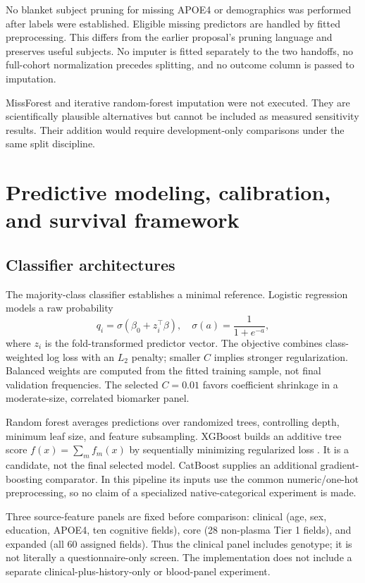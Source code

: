 \documentclass[11pt,a4paper]{article}
\begin{document}
No blanket subject pruning for missing APOE4 or demographics was performed after labels were established. Eligible missing predictors are handled by fitted preprocessing. This differs from the earlier proposal's pruning language and preserves useful subjects. No imputer is fitted separately to the two handoffs, no full-cohort normalization precedes splitting, and no outcome column is passed to imputation.

MissForest and iterative random-forest imputation were not executed. They are scientifically plausible alternatives but cannot be included as measured sensitivity results. Their addition would require development-only comparisons under the same split discipline.

\clearpage
\section{Predictive modeling, calibration, and survival framework}
\subsection{Classifier architectures}
The majority-class classifier establishes a minimal reference. Logistic regression models a raw probability
\begin{equation}q_i=\sigma(\beta_0+z_i^\top\beta),\quad \sigma(a)=\frac{1}{1+e^{-a}},\end{equation}
where $z_i$ is the fold-transformed predictor vector. The objective combines class-weighted log loss with an $L_2$ penalty; smaller $C$ implies stronger regularization. Balanced weights are computed from the fitted training sample, not final validation frequencies. The selected $C=0.01$ favors coefficient shrinkage in a moderate-size, correlated biomarker panel.

Random forest averages predictions over randomized trees, controlling depth, minimum leaf size, and feature subsampling. XGBoost builds an additive tree score $f(x)=\sum_m f_m(x)$ by sequentially minimizing regularized loss \cite{xgb}. It is a candidate, not the final selected model. CatBoost supplies an additional gradient-boosting comparator. In this pipeline its inputs use the common numeric/one-hot preprocessing, so no claim of a specialized native-categorical experiment is made.

Three source-feature panels are fixed before comparison: clinical (age, sex, education, APOE4, ten cognitive fields), core (28 non-plasma Tier 1 fields), and expanded (all 60 assigned fields). Thus the clinical panel includes genotype; it is not literally a questionnaire-only screen. The implementation does not include a separate clinical-plus-history-only or blood-panel experiment.
\end{document}
